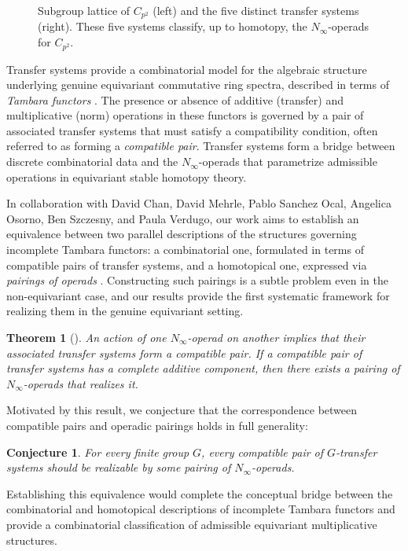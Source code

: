 \documentclass[11pt]{article}
\newtheorem{theorem}{Theorem}
\newtheorem*{conjecture}{Conjecture}
\begin{document}
\begin{figure}[h]
\captionsetup{font=footnotesize} %
\caption{Subgroup lattice of $C_{p^2}$ (left) and the five distinct transfer systems (right). These five systems classify, up to homotopy, the $N_\infty$-operads for $C_{p^2}$.}
\label{fig:transferCp2}
\end{figure}

Transfer systems provide a combinatorial model for the algebraic structure underlying genuine equivariant commutative ring spectra, described in terms of {\it Tambara functors} \cite{MR1209937}.
The presence or absence of additive (transfer) and multiplicative (norm) operations in these functors is governed by a pair of associated transfer systems that must satisfy a compatibility condition, often referred to as forming a {\it compatible pair}.
Transfer systems form a bridge between discrete combinatorial data and the $N_\infty$-operads that parametrize admissible operations in equivariant stable homotopy theory.

In collaboration with David Chan, David Mehrle, Pablo Sanchez Ocal, Angelica Osorno, Ben Szczesny, and Paula Verdugo, our work aims to establish an equivalence between two parallel descriptions of the structures governing incomplete Tambara functors:
a combinatorial one, formulated in terms of compatible pairs of transfer systems, and a homotopical one, expressed via {\it pairings of operads} \cite{MR2544392}.
Constructing such pairings is a subtle problem even in the non-equivariant case, and our results provide the first systematic framework for realizing them in the genuine equivariant setting.

\begin{theorem}[\cite{CCM+}]
An action of one $N_\infty$-operad on another implies that their associated transfer systems form a compatible pair.
If a compatible pair of transfer systems has a complete additive component, then there exists a pairing of $N_\infty$-operads that realizes it.
\end{theorem}

Motivated by this result, we conjecture that the correspondence between compatible pairs and operadic pairings holds in full generality:
\begin{conjecture}
 For every finite group $G$, every compatible pair of $G$-transfer systems should be realizable by some pairing of $N_\infty$-operads.
\end{conjecture}
Establishing this equivalence would complete the conceptual bridge between the combinatorial and homotopical descriptions of incomplete Tambara functors and provide a combinatorial classification of admissible equivariant multiplicative structures.
\end{document}
